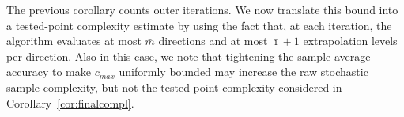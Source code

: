 \documentclass[11pt,a4paper]{article}
\newcommand{\F}{\mathcal{F}}
\newcommand{\Imax}{\bar{\imath}}%
\newcommand{\EE}{\mathbb{E}}
\begin{document}
The previous corollary counts outer iterations. We now translate this bound into
a tested-point complexity estimate by using the fact that, at each iteration, the
algorithm evaluates at most \(\bar{m}\) directions and at most \(\Imax+1\)
extrapolation levels per direction. Also in this case, we note that tightening
the sample-average accuracy to make $c_{max}$ uniformly bounded may increase the raw stochastic sample complexity, but not the tested-point complexity considered in Corollary~\ref{cor:finalcompl}.
\end{document}
